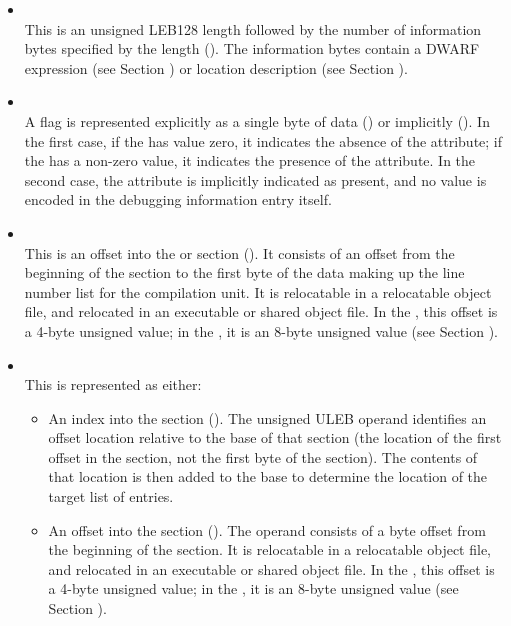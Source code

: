 \begin{itemize}
\item \CLASSexprloc \\
This is an unsigned LEB128 length 
followed by the number of information bytes specified by the 
length (\DWFORMexprlocTARG). 
The information bytes contain a DWARF expression 
(see Section ) 
or location description 
(see Section ).

\item \CLASSflag \\
A flag 
is represented explicitly as a single byte of data
(\DWFORMflagTARG) or implicitly (\DWFORMflagpresentTARG). In the
first case, if the  has value zero, it indicates the
absence of the attribute; if the  has a non-zero value,
it indicates the presence of the attribute. In the second
case, the attribute is implicitly indicated as present, and
no value is encoded in the debugging information entry itself.

\item \CLASSlineptr \\
This is an offset into 
the 
\dotdebugline{} or \dotdebuglinedwo{} section
(\DWFORMsecoffset).
It consists of an offset from the beginning of the 
\dotdebugline{}
section to the first byte of
the data making up the line number list for the compilation
unit. 
It is relocatable in a relocatable object file, and
relocated in an executable or shared object file. In the 
\thirtytwobitdwarfformat, this offset is a 4-byte unsigned value;
in the \sixtyfourbitdwarfformat, it is an 8-byte unsigned value
(see Section ).

\item \CLASSloclist \\
This is represented as either:
\begin{itemize}
\item
An index into the \dotdebugloclists{} section (\DWFORMloclistxTARG). 
The unsigned ULEB operand identifies an offset location 
relative to the base of that section (the location of the first offset 
in the section, not the first byte of the section). The contents of 
that location is then added to the base to determine the location of 
the target list of entries.
\item
An offset into the \dotdebugloclists{} section (\DWFORMsecoffset). 
The operand consists of a byte 
offset
from the beginning of the \dotdebugloclists{} section.
It is relocatable in a relocatable object file, and
relocated in an executable or shared object file. In the 
\thirtytwobitdwarfformat, this offset is a 4-byte unsigned value;
in the \sixtyfourbitdwarfformat, it is an 8-byte unsigned value
(see Section ).
\end{itemize}


\end{itemize}
